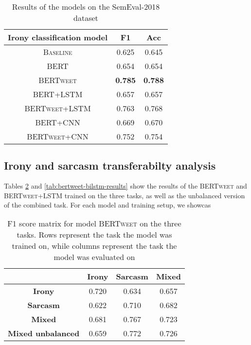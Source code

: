 \documentclass[10pt, a4paper]{article}
\begin{document}
\begin{table}[h]
   \caption{Results of the models on the SemEval-2018 dataset}
   \label{tab:semeval-2018}
   \begin{center}
   \begin{tabular}{|c|c|c|}
   \toprule
   Irony classification model & F1 & Acc\\
   \midrule
   \textsc{Baseline} & 0.625 & 0.645 \\
   \textsc{BERT} & 0.654 & 0.654 \\
   \textsc{BERTweet} & \textbf{0.785} & \textbf{0.788} \\
   \textsc{BERT+LSTM} & 0.657 & 0.657 \\
   \textsc{BERTweet+LSTM} & 0.763 & 0.768 \\
   \textsc{BERT+CNN} & 0.669 & 0.670 \\
   \textsc{BERTweet+CNN} & 0.752 & 0.754 \\
   \bottomrule
   \end{tabular}
   \end{center}
\end{table}

\subsection{Irony and sarcasm transferabilty analysis}\label{task-analysis}

Tables \ref{tab:bertweet-results} and \ref{tab:bertweet-bilstm-results} show the results of the \textsc{BERTweet} and
\textsc{BERTweet+LSTM} trained on the three tasks, as well as the unbalanced version of the combined task. For each model
and training setup, we showcas

\begin{table}[h!]
   \centering
   \begin{tabular}{|c|c|c|c|}
       \hline
        & \textbf{Irony} & \textbf{Sarcasm} & \textbf{Mixed} \\ \hline
       \textbf{Irony} & 0.720 & 0.634 & 0.657 \\ \hline
       \textbf{Sarcasm} & 0.622 & 0.710 & 0.682 \\ \hline
       \textbf{Mixed} & 0.681 & 0.767 & 0.723 \\ \hline
       \textbf{Mixed unbalanced} & 0.659 & 0.772 & 0.726\\ \hline
   \end{tabular}
   \caption{F1 score matrix for model \textsc{BERTweet} on the three tasks. Rows represent the task the model was trained on, 
   while columns represent the task the model was evaluated on}
   \label{tab:bertweet-results}
\end{table}
\end{document}
